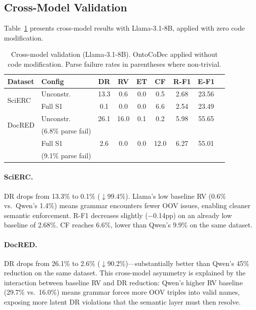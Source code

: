 \documentclass[11pt,a4paper]{article}
\newcommand{\method}{OntoCoDec}
\begin{document}
\subsection{Cross-Model Validation}
\label{sec:cross_model}

Table~\ref{tab:cross_model} presents cross-model results with Llama-3.1-8B, applied with zero code modification.

\begin{table}[t]
\centering
\small
\caption{Cross-model validation (Llama-3.1-8B). \method{} applied without code modification. Parse failure rates in parentheses where non-trivial.}
\label{tab:cross_model}
\begin{tabular}{llccccccc}
\toprule
\textbf{Dataset} & \textbf{Config} & \textbf{DR} & \textbf{RV} & \textbf{ET} & \textbf{CF} & \textbf{R-F1} & \textbf{E-F1} \\
\midrule
\multirow{2}{*}{SciERC}
    & Unconstr. & 13.3 & 0.6 & 0.0 & 0.5 & 2.68 & 23.56 \\
    & Full S1   & 0.1  & 0.0 & 0.0 & 6.6 & 2.54 & 23.49 \\
\midrule
\multirow{2}{*}{DocRED}
    & Unconstr. & 26.1 & 16.0 & 0.1 & 0.2 & 5.98 & 55.65 \\
    & \hspace{1em}\scriptsize{(6.8\% parse fail)} & & & & & & \\
    & Full S1   & 2.6  & 0.0 & 0.0 & 12.0 & 6.27 & 55.01 \\
    & \hspace{1em}\scriptsize{(9.1\% parse fail)} & & & & & & \\
\bottomrule
\end{tabular}
\end{table}

\paragraph{SciERC.}
DR drops from 13.3\% to 0.1\% ($\downarrow$99.4\%). Llama's low baseline RV (0.6\% vs.\ Qwen's 1.4\%) means grammar encounters fewer OOV issues, enabling cleaner semantic enforcement. R-F1 decreases slightly ($-$0.14pp) on an already low baseline of 2.68\%. CF reaches 6.6\%, lower than Qwen's 9.9\% on the same dataset.

\paragraph{DocRED.}
DR drops from 26.1\% to 2.6\% ($\downarrow$90.2\%)---substantially better than Qwen's 45\% reduction on the same dataset. This cross-model asymmetry is explained by the interaction between baseline RV and DR reduction: Qwen's higher RV baseline (29.7\% vs.\ 16.0\%) means grammar forces more OOV triples into valid names, exposing more latent DR violations that the semantic layer must then resolve.
\end{document}
